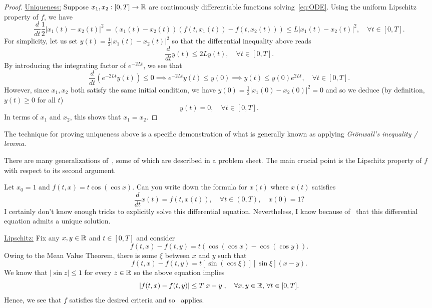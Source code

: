 \begin{proof}
	\ul{Uniqueness:} Suppose $x_1,x_2:[0,T]\to\mathbb{R}$ are continuously differentiable functions solving~\eqref{eq:ODE}. Using the uniform Lipschitz property of $f$, we have
	\[
	\frac{d}{dt}\frac{1}{2}|x_1(t)-x_2(t)|^2 = (x_1(t)-x_2(t))(f(t,x_1(t))-f(t,x_2(t)))\le L|x_1(t)-x_2(t)|^2,\quad \forall t\in[0,T].
	\]
	For simplicity, let us set $y(t) = \frac{1}{2}|x_1(t)-x_2(t)|^2$ so that the differential inequality above reads
	\[
	\frac{d}{dt}y(t) \le 2Ly(t),\quad \forall t\in[0,T].
	\]
	By introducing the integrating factor of $e^{-2Lt}$, we see that
	\[
	\frac{d}{dt}\left( e^{-2Lt}y(t) \right)\le 0 \implies e^{-2Lt}y(t) \le y(0)\implies y(t) \le y(0) e^{2Lt},\quad \forall t\in[0,T].
	\]
	However, since $x_1,x_2$ both satisfy the same initial condition, we have $y(0) = \frac{1}{2}|x_1(0)-x_2(0)|^2 = 0$ and so we deduce (by definition, $y(t) \ge 0$ for all $t$)
	\[
	y(t) = 0,\quad \forall t\in[0,T].
	\]
	In terms of $x_1$ and $x_2$, this shows that $x_1 = x_2$.
\end{proof}
\begin{rem}
	The technique for proving uniqueness above is a specific demonstration of what is generally known as applying \textit{Gr\"onwall's inequality / lemma.}
\end{rem}
There are many generalizations of~, some of which are described in a problem sheet. The main crucial point is the Lipschitz property of $f$ with respect to its second argument.
\begin{eg}[An application]
	Let $x_0 = 1$ and $f(t,x) = t\cos(\cos x)$. Can you write down the formula for $x(t)$ where $x(t)$ satisfies
	\[
	\frac{d}{dt}x(t) = f(t,x(t)),\quad \forall t\in(0,T),\quad x(0) = 1?
	\]
	I certainly don't know enough tricks to explicitly solve this differential equation. Nevertheless, I know because of~ that this differential equation admits a unique solution.
	
	\ul{Lipschitz:} Fix any $x,y\in \mathbb{R}$ and $t\in[0,T]$ and consider
	\[
	f(t,x) - f(t,y) = t \left(\cos(\cos x) - \cos(\cos y)\right).
	\]
	Owing to the Mean Value Theorem, there is some $\xi$ between $x$ and $y$ such that
	\[
	f(t,x) - f(t,y) = t\left[\sin(\cos \xi)\right]\left[\sin \xi\right] (x-y).
	\]
	We know that $|\sin z| \le 1$ for every $z\in\mathbb{R}$ so the above equation implies
	\[
	|f(t,x) - f(t,y)| \le T|x-y|,\quad \forall x,y\in \mathbb{R},\,\forall t\in[0,T].
	\]
	Hence, we see that $f$ satisfies the desired criteria and so~ applies.
\end{eg}
